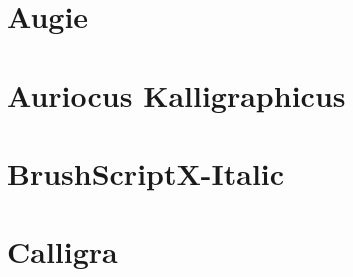\documentclass{article}
\begin{document}
\section{Augie} {\ECFAugie\lipsum[4]}
\section{Auriocus Kalligraphicus} {\Fontauri\lipsum[4]}
\section{BrushScriptX-Italic} {\bsifamily\lipsum[4]}
\section{Calligra} {\calligra\lipsum[4]}
\end{document}
